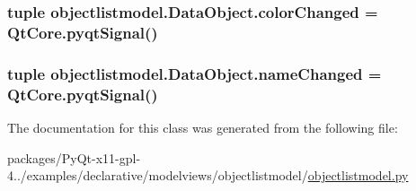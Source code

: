 \subsubsection[{color\+Changed}]{\setlength{\rightskip}{0pt plus 5cm}tuple objectlistmodel.\+Data\+Object.\+color\+Changed = Qt\+Core.\+pyqt\+Signal()\hspace{0.3cm}{\ttfamily [static]}}\label{classobjectlistmodel_1_1DataObject_a25c188859159ba5c234a177e3d4cd840}
\hypertarget{classobjectlistmodel_1_1DataObject_a17de6b991c8e8221ea05d35e9b0dd676}{}
\subsubsection[{name\+Changed}]{\setlength{\rightskip}{0pt plus 5cm}tuple objectlistmodel.\+Data\+Object.\+name\+Changed = Qt\+Core.\+pyqt\+Signal()\hspace{0.3cm}{\ttfamily [static]}}\label{classobjectlistmodel_1_1DataObject_a17de6b991c8e8221ea05d35e9b0dd676}


The documentation for this class was generated from the following file\+:\begin{DoxyCompactItemize}
\item 
packages/\+Py\+Qt-\/x11-\/gpl-\/4../examples/declarative/modelviews/objectlistmodel/\hyperlink{objectlistmodel_8py}{objectlistmodel.\+py}\end{DoxyCompactItemize}
